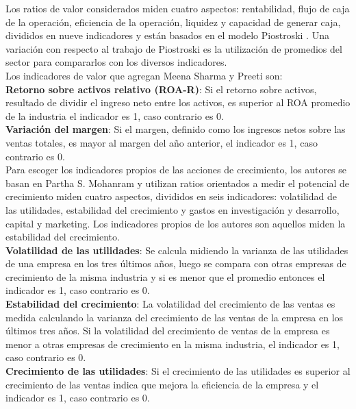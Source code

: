 Los ratios de valor considerados miden cuatro aspectos: rentabilidad, flujo de caja de la operación, eficiencia de la operación, liquidez y capacidad de generar caja, divididos en nueve indicadores y est\'an basados en el modelo Piostroski \cite{Piotroski2000}. Una variaci\'on  con respecto al trabajo de Piostroski es la utilizaci\'on de promedios del sector para compararlos con los diversos indicadores.\\

Los indicadores de valor que agregan Meena Sharma y Preeti son:\\

\textbf{Retorno sobre activos relativo (ROA-R)}: Si el retorno sobre activos, resultado de dividir el ingreso neto entre los activos, es superior al ROA promedio de la industria el indicador es 1, caso contrario es 0.\\

\textbf{Variación del margen}: Si el margen, definido como los ingresos netos sobre las ventas totales, es mayor al margen del año anterior, el indicador es 1, caso contrario es 0.\\

Para escoger los indicadores propios de las acciones de crecimiento, los autores se basan en Partha S. Mohanram \cite{Mohanram2005} y utilizan ratios orientados a medir el potencial de crecimiento miden cuatro aspectos, divididos en seis indicadores: volatilidad de las utilidades, estabilidad del crecimiento y gastos en investigación y desarrollo, capital y marketing. Los indicadores propios de los autores son aquellos miden la estabilidad del crecimiento.\\

\textbf{Volatilidad de las utilidades}: Se calcula midiendo la varianza de las utilidades de una empresa en los tres últimos años, luego se compara con otras empresas de crecimiento de la misma industria y si es menor que el promedio entonces el indicador es 1, caso contrario es 0.\\

\textbf{Estabilidad del crecimiento}: La volatilidad del crecimiento de las ventas es medida calculando la varianza del crecimiento de las ventas de la empresa en los últimos tres años. Si la volatilidad del crecimiento de ventas de la empresa es menor a otras empresas de crecimiento en la misma industria, el indicador es 1, caso contrario es 0.\\

\textbf{Crecimiento de las utilidades}: Si el crecimiento de las utilidades es superior al crecimiento de las ventas indica que mejora la eficiencia de la empresa y el indicador es 1, caso contrario es 0.\\

